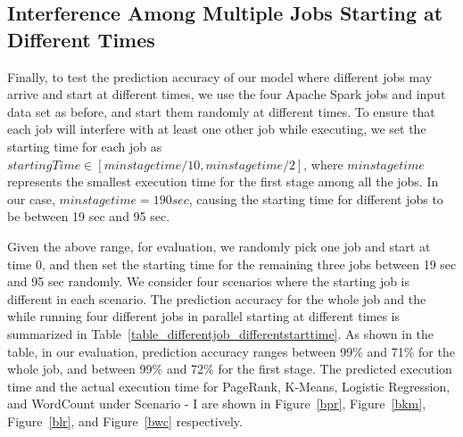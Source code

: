 \subsection{Interference Among Multiple Jobs Starting at Different Times}
\label{newsection}
Finally, to test the prediction accuracy of our model where different jobs may arrive and start at different times, we use the four Apache Spark jobs and input data set as before, and start them randomly at different times. To ensure that each job will interfere with at least one other job while executing, we set the starting time for each job as $startingTime \in [minstagetime / 10, minstagetime / 2]$, where $minstagetime$ represents the smallest execution time for the first stage among all the jobs. In our case, $minstagetime=190 sec$, causing the starting time for different jobs to be between 19 sec and 95 sec.

\noindent
Given the above range, for evaluation, we randomly pick one job and start at time 0, and then 
set the starting time for the remaining three jobs between 19 sec and 95 sec randomly. 
We consider four scenarios where the starting job is different in each scenario. The prediction accuracy for the whole job and the while running four different jobs in parallel starting at different times is summarized in Table~\ref{table_differentjob_differentstarttime}. As shown in the table, in our evaluation, prediction accuracy ranges between 99\% and 71\% for the whole job, and between 99\% and 72\% for the first stage. The predicted execution time and the actual execution time for PageRank, K-Means, Logistic Regression, and WordCount under Scenario - I are shown in Figure~\ref{bpr}, Figure~\ref{bkm}, Figure~\ref{blr}, and Figure~\ref{bwc} respectively. 



